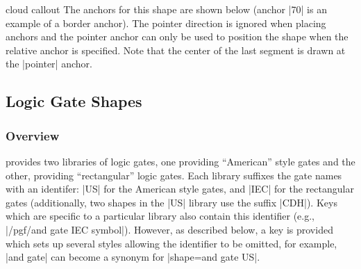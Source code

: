 \begin{shape}{cloud callout}
The anchors for this shape are shown below (anchor |70| is an example 
of a border anchor). The pointer direction is ignored when placing 
anchors and the pointer anchor can only be used to position the
shape when the relative anchor is specified. Note that the center
of the last segment is drawn at the |pointer| anchor.

\begin{codeexample}[]
\Huge
{}
\end{codeexample}%
\end{shape}




\subsection{Logic Gate Shapes}

\subsubsection{Overview}
	\pgfname{} provides two libraries of logic gates, one providing
	``American'' style gates and the other, providing ``rectangular'' 
	logic gates.	
	Each library suffixes the gate names with an identifer:
	|US| for the American style gates, and |IEC| for the rectangular
	gates (additionally, two shapes in the |US| library use the
	suffix |CDH|). Keys which are specific
	to a particular library	also contain this identifier (e.g., 
	|/pgf/and gate IEC symbol|).
	However, as described below, a \tikzname{} key is provided which
	sets up several styles allowing the identifier to be omitted,
	for example, |and gate| can become a synonym for |shape=and gate US|.
	
